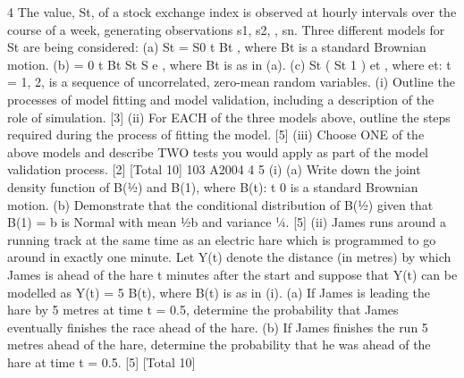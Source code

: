 
4 The value, St, of a stock exchange index is observed at hourly intervals over the
course of a week, generating observations s1, s2, , sn.
Three different models for St are being considered:
(a) St = S0 t Bt , where Bt is a standard Brownian motion.
(b) = 0 t Bt
St S e , where Bt is as in (a).
(c) St ( St 1 ) et , where {et: t = 1, 2, } is a sequence of
uncorrelated, zero-mean random variables.
(i) Outline the processes of model fitting and model validation, including a
description of the role of simulation. [3]
(ii) For EACH of the three models above, outline the steps required during the
process of fitting the model. [5]
(iii) Choose ONE of the above models and describe TWO tests you would apply as
part of the model validation process. [2]
[Total 10]
103 A2004 4
5 (i) (a) Write down the joint density function of B(½) and B(1), where
{B(t): t 0} is a standard Brownian motion.
(b) Demonstrate that the conditional distribution of B(½) given that
B(1) = b is Normal with mean ½b and variance ¼.
[5]
(ii) James runs around a running track at the same time as an electric hare which
is programmed to go around in exactly one minute. Let Y(t) denote the
distance (in metres) by which James is ahead of the hare t minutes after the
start and suppose that Y(t) can be modelled as Y(t) = 5 B(t), where B(t) is as
in (i).
(a) If James is leading the hare by 5 metres at time t = 0.5, determine the
probability that James eventually finishes the race ahead of the hare.
(b) If James finishes the run 5 metres ahead of the hare, determine the
probability that he was ahead of the hare at time t = 0.5.
[5]
[Total 10]

